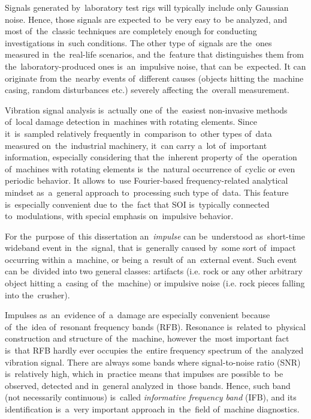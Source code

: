 Signals generated by~laboratory test rigs will typically include only Gaussian noise. Hence, those signals are expected to~be very easy to~be analyzed, and most of~the~classic techniques are completely enough for conducting investigations in~such conditions. The other type of~signals are the~ones measured in~the~real-life scenarios, and the~feature that distinguishes them from the~laboratory-produced ones is~an~impulsive noise, that can be~expected. It can originate from the~nearby events of~different causes (objects hitting the~machine casing, random disturbances etc.) severely affecting the~overall measurement. 

Vibration signal analysis is~actually one of~the~easiest non-invasive methods of~local damage detection in~machines with rotating elements. Since it~is~sampled relatively frequently in~comparison to~other types of~data measured on~the~industrial machinery, it~can carry a~lot of~important information, especially considering that the~inherent property of~the~operation of~machines with rotating elements is~the~natural occurrence of~cyclic or even periodic behavior. It allows to~use Fourier-based frequency-related analytical mindset as~a~general approach to~processing such type of~data. This feature is~especially convenient due to~the~fact that SOI is~typically connected to~modulations, with special emphasis on~impulsive behavior. 

For the~purpose of~this dissertation an~\emph{impulse} can be~understood as~short-time wideband event in~the~signal, that is~generally caused by~some sort of~impact occurring within a~machine, or being a~result of~an~external event. Such event can be~divided into two general classes: artifacts (i.e. rock or any other arbitrary object hitting a~casing of~the~machine) or impulsive noise (i.e. rock pieces falling into the~crusher).

Impulses as~an~evidence of~a~damage are especially convenient because of~the~idea of~resonant frequency bands (RFB). Resonance is~related to~physical construction and structure of~the~machine, however the~most important fact is~that RFB hardly ever occupies the~entire frequency spectrum of~the~analyzed vibration signal. There are always some bands where signal-to-noise ratio (SNR) is~relatively high, which in~practice means that impulses are possible to~be observed, detected and in~general analyzed in~those bands. Hence, such band (not necessarily continuous) is~called \emph{informative frequency band} (IFB), and its identification is~a~very important approach in~the~field of~machine diagnostics.

